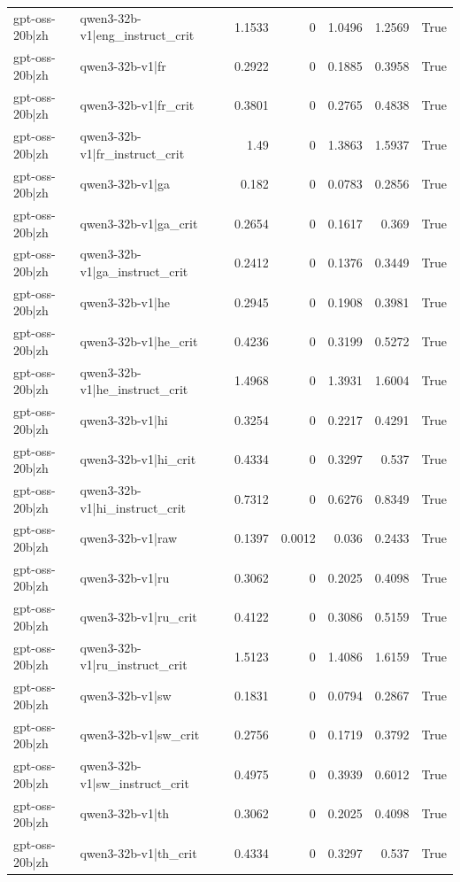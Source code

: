 \begin{table}
\begin{tabular}{l l r r r r l}
gpt-oss-20b|zh & qwen3-32b-v1|eng_instruct_crit & 1.1533 & 0 & 1.0496 & 1.2569 & True \\
gpt-oss-20b|zh & qwen3-32b-v1|fr & 0.2922 & 0 & 0.1885 & 0.3958 & True \\
gpt-oss-20b|zh & qwen3-32b-v1|fr_crit & 0.3801 & 0 & 0.2765 & 0.4838 & True \\
gpt-oss-20b|zh & qwen3-32b-v1|fr_instruct_crit & 1.49 & 0 & 1.3863 & 1.5937 & True \\
gpt-oss-20b|zh & qwen3-32b-v1|ga & 0.182 & 0 & 0.0783 & 0.2856 & True \\
gpt-oss-20b|zh & qwen3-32b-v1|ga_crit & 0.2654 & 0 & 0.1617 & 0.369 & True \\
gpt-oss-20b|zh & qwen3-32b-v1|ga_instruct_crit & 0.2412 & 0 & 0.1376 & 0.3449 & True \\
gpt-oss-20b|zh & qwen3-32b-v1|he & 0.2945 & 0 & 0.1908 & 0.3981 & True \\
gpt-oss-20b|zh & qwen3-32b-v1|he_crit & 0.4236 & 0 & 0.3199 & 0.5272 & True \\
gpt-oss-20b|zh & qwen3-32b-v1|he_instruct_crit & 1.4968 & 0 & 1.3931 & 1.6004 & True \\
gpt-oss-20b|zh & qwen3-32b-v1|hi & 0.3254 & 0 & 0.2217 & 0.4291 & True \\
gpt-oss-20b|zh & qwen3-32b-v1|hi_crit & 0.4334 & 0 & 0.3297 & 0.537 & True \\
gpt-oss-20b|zh & qwen3-32b-v1|hi_instruct_crit & 0.7312 & 0 & 0.6276 & 0.8349 & True \\
gpt-oss-20b|zh & qwen3-32b-v1|raw & 0.1397 & 0.0012 & 0.036 & 0.2433 & True \\
gpt-oss-20b|zh & qwen3-32b-v1|ru & 0.3062 & 0 & 0.2025 & 0.4098 & True \\
gpt-oss-20b|zh & qwen3-32b-v1|ru_crit & 0.4122 & 0 & 0.3086 & 0.5159 & True \\
gpt-oss-20b|zh & qwen3-32b-v1|ru_instruct_crit & 1.5123 & 0 & 1.4086 & 1.6159 & True \\
gpt-oss-20b|zh & qwen3-32b-v1|sw & 0.1831 & 0 & 0.0794 & 0.2867 & True \\
gpt-oss-20b|zh & qwen3-32b-v1|sw_crit & 0.2756 & 0 & 0.1719 & 0.3792 & True \\
gpt-oss-20b|zh & qwen3-32b-v1|sw_instruct_crit & 0.4975 & 0 & 0.3939 & 0.6012 & True \\
gpt-oss-20b|zh & qwen3-32b-v1|th & 0.3062 & 0 & 0.2025 & 0.4098 & True \\
gpt-oss-20b|zh & qwen3-32b-v1|th_crit & 0.4334 & 0 & 0.3297 & 0.537 & True \\

\end{tabular}
\end{table}
